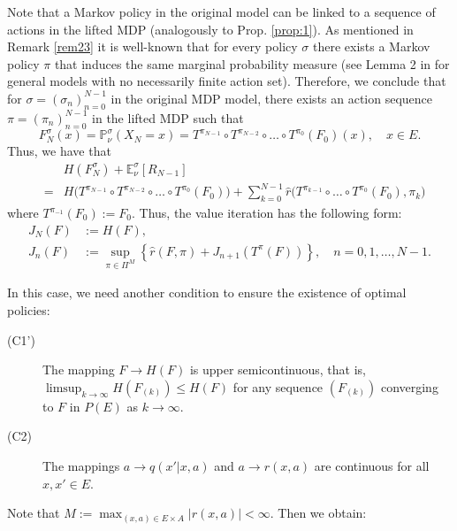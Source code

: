 \documentclass[reqno, 12pt]{amsart}%
\newcommand{\PP}{\mathbb{P}}
\newcommand{\EE}{\mathbb{E}}
\theoremstyle{definition}
\numberwithin{equation}{section} \numberwithin{theorem}{section}
\begin{document}
Note that a Markov policy in the original model 
can be linked to a sequence of actions in the 
lifted MDP (analogously to Prop. \ref{prop:1}). As mentioned in Remark \ref{rem23}
it is well-known that  
for every policy $\sigma$ there exists a Markov policy $\pi$ that induces the same marginal probability measure (see Lemma 2 in \cite{piun1997} for general models with no necessarily  finite action set). Therefore, we conclude that
for
$\sigma=(\sigma_n)_{n=0}^{N-1}$ in the original MDP model, there exists an action sequence 
$\pi=(\pi_n)_{n=0}^{N-1}$ in the lifted MDP such that
  $$F_N^\sigma(x)=\PP^\sigma_\nu(X_N=x) = 
T^{\pi_{N-1}}\circ T^{\pi_{N-2}} \circ \ldots \circ 
T^{\pi_0}(F_0)(x),\quad x\in E. $$ 
Thus, we have that
\begin{eqnarray}\label{pirat}
 && H(F_N^\sigma) +  \EE_\nu^\sigma [R_{N-1}]  \\
 &=&  H \Big( T^{\pi_{N-1}}\circ T^{\pi_{N-2}} \circ \ldots \circ T^{\pi_0}(F_0)\Big)+ \sum_{k=0}^{N-1} \hat r\Big(  T^{\pi_{k-1}}\circ  \ldots \circ T^{\pi_0}(F_0),\pi_k\Big) \nonumber
\end{eqnarray}
where $T^{\pi_{-1}}(F_0):= F_0.$ 
Thus, the value iteration has the following form:
\begin{align}
  \nonumber  J_N(F) & := H(F),\\
    J_n(F) &:= \sup_{\pi\in \Pi^M} \left\{ \hat r (F,\pi)+ J_{n+1}(T^\pi(F)) \right\},\quad n=0,1,\ldots ,N-1. \label{eq:DPEcompact}
\end{align}

In this case, we need another condition to ensure the existence of optimal policies:
\begin{description}
\item[(C1')] The mapping $F\to H(F)$ is upper 
semicontinuous, that is,
$\limsup_{k\to\infty} H(F_{(k)}) \le H(F)$
for any sequence $(F_{(k)})$ converging to $F$ in
$P(E)$ as $k\to\infty.$
    \item[(C2)] The mappings $a\to q(x'|x,a)$ and $a\to r(x,a)$ are continuous for all $x,x'\in E$. 
\end{description}

Note that 
$M:=\max_{(x,a)\in E\times A}|r(x,a)|<\infty.$
Then we obtain:
\end{document}
